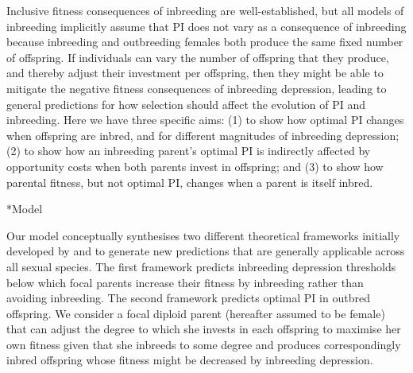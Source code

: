 \documentclass[12pt]{article}
\makeatletter
\renewcommand\section{\@startsection{section}{1}{0in}{-0.5\baselineskip}{0.1\baselineskip}{\normalfont\large\bfseries}}
\makeatother
\begin{document}
Inclusive fitness consequences of inbreeding are well-established, but all models of inbreeding implicitly assume that PI does not vary as a consequence of inbreeding because inbreeding and outbreeding females both produce the same fixed number of offspring. If individuals can vary the number of offspring that they produce, and thereby adjust their investment per offspring, then they might be able to mitigate the negative fitness consequences of inbreeding depression, leading to general predictions for how selection should affect the evolution of PI and inbreeding. Here we have three specific aims: (1) to show how optimal PI changes when offspring are inbred, and for different magnitudes of inbreeding depression; (2) to show how an inbreeding parent's optimal PI is indirectly affected by opportunity costs when both parents invest in offspring; and (3) to show how parental fitness, but not optimal PI, changes when a parent is itself inbred.


\section*{Model}

Our model conceptually synthesises two different theoretical frameworks initially developed by \cite{Parker1979} and \cite{Macnair1978} to generate new predictions that are generally applicable across all sexual species. The first framework \cite[][]{Parker1979} predicts inbreeding depression thresholds below which focal parents increase their fitness by inbreeding rather than avoiding inbreeding. The second framework \cite[][]{Macnair1978} predicts optimal PI in outbred offspring. We consider a focal diploid parent (hereafter assumed to be female) that can adjust the degree to which she invests in each offspring to maximise her own fitness given that she inbreeds to some degree and produces correspondingly inbred offspring whose fitness might be decreased by inbreeding depression.  
\end{document}
